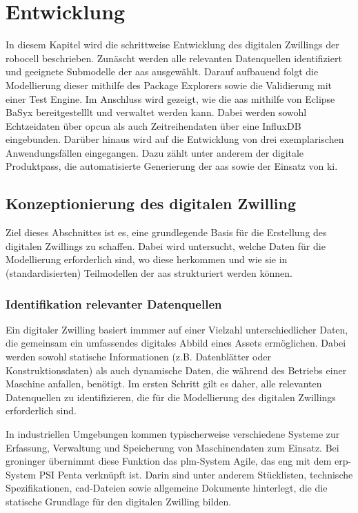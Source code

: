 \section{Entwicklung}
In diesem Kapitel wird die schrittweise Entwicklung des digitalen Zwillings der robocell beschrieben.
Zunäscht werden alle relevanten Datenquellen identifiziert und geeignete Submodelle der \acs{aas} ausgewählt.
Darauf aufbauend folgt die Modellierung dieser mithilfe des Package Explorers sowie die Validierung mit einer Test Engine.
Im Anschluss wird gezeigt, wie die \acs{aas} mithilfe von Eclipse BaSyx bereitgestelllt und verwaltet werden kann.
Dabei werden sowohl Echtzeidaten über \acs{opcua} als auch Zeitreihendaten über eine InfluxDB eingebunden.
Darüber hinaus wird auf die Entwicklung von drei exemplarischen Anwendungsfällen eingegangen.
Dazu zählt unter anderem der digitale Produktpass, die automatisierte Generierung der \acs{aas} sowie der Einsatz von \acs{ki}.

\subsection{Konzeptionierung des digitalen Zwilling}
Ziel dieses Abschnittes ist es, eine grundlegende Basis für die Erstellung des digitalen Zwillings zu schaffen.
Dabei wird untersucht, welche Daten für die Modellierung erforderlich sind, wo diese herkommen und wie sie in (standardisierten) Teilmodellen der \acs{aas} strukturiert werden können.
\subsubsection{Identifikation relevanter Datenquellen}
Ein digitaler Zwilling basiert immmer auf einer Vielzahl unterschiedlicher Daten, die gemeinsam ein umfassendes digitales Abbild eines Assets ermöglichen. 
Dabei werden sowohl statische Informationen (z.B. Datenblätter oder Konstruktionsdaten) als auch dynamische Daten, die während des Betriebs einer Maschine anfallen, benötigt.
Im ersten Schritt gilt es daher, alle relevanten Datenquellen zu identifizieren, die für die Modellierung des digitalen Zwillings erforderlich sind.

In industriellen Umgebungen kommen typischerweise verschiedene Systeme zur Erfassung, Verwaltung und Speicherung von Maschinendaten zum Einsatz.
Bei groninger übernimmt diese Funktion das \acs{plm}-System Agile, das eng mit dem \acs{erp}-System PSI Penta verknüpft ist.
Darin sind unter anderem Stücklisten, technische Spezifikationen, \acs{cad}-Dateien sowie allgemeine Dokumente hinterlegt, die die statische Grundlage  für den digitalen Zwilling bilden.

